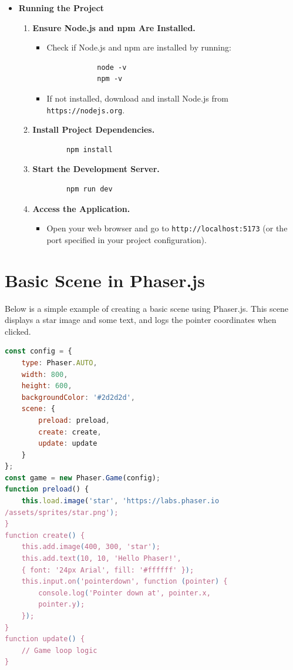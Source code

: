 \begin{itemize}
    \item \textbf{Running the Project}
    \begin{enumerate}[label=\textbf{Step \arabic*:}]
        \item \textbf{Ensure Node.js and npm Are Installed.}
        \begin{itemize}
            \item Check if Node.js and npm are installed by running:
            \begin{verbatim}
            node -v
            npm -v
            \end{verbatim}
            \item If not installed, download and install Node.js from \texttt{https://nodejs.org}.
        \end{itemize}
        \item \textbf{Install Project Dependencies.}
        \begin{verbatim}
        npm install
        \end{verbatim}
        \item \textbf{Start the Development Server.}
        \begin{verbatim}
        npm run dev
        \end{verbatim}
        \item \textbf{Access the Application.}
        \begin{itemize}
            \item Open your web browser and go to \texttt{http://localhost:5173} (or the port specified in your project configuration).
        \end{itemize}
    \end{enumerate}
\end{itemize}
\section{Basic Scene in Phaser.js}

Below is a simple example of creating a basic scene using Phaser.js. This scene displays a star image and some text, and logs the pointer coordinates when clicked.

\begin{lstlisting}[language=JavaScript,  basicstyle=\ttfamily, keywordstyle=\color{blue}, commentstyle=\color{green}]
const config = {
    type: Phaser.AUTO,
    width: 800,
    height: 600,
    backgroundColor: '#2d2d2d',
    scene: {
        preload: preload,
        create: create,
        update: update
    }
};
const game = new Phaser.Game(config);
function preload() {
    this.load.image('star', 'https://labs.phaser.io
/assets/sprites/star.png');
}
function create() {
    this.add.image(400, 300, 'star');
    this.add.text(10, 10, 'Hello Phaser!', 
    { font: '24px Arial', fill: '#ffffff' });
    this.input.on('pointerdown', function (pointer) {
        console.log('Pointer down at', pointer.x,
        pointer.y);
    });
}
function update() {
    // Game loop logic
}
\end{lstlisting}
